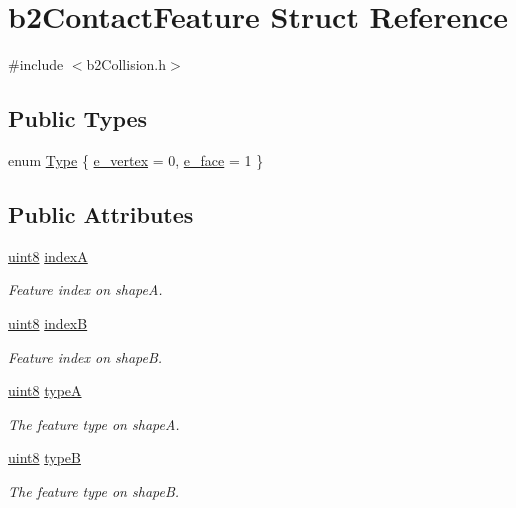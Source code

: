 \hypertarget{structb2_contact_feature}{}\section{b2\+Contact\+Feature Struct Reference}
\label{structb2_contact_feature}


{\ttfamily \#include $<$b2\+Collision.\+h$>$}

\subsection*{Public Types}
\begin{DoxyCompactItemize}
\item 
enum \mbox{\hyperlink{structb2_contact_feature_a29fb037bd886215d2ddd6e68148ac154}{Type}} \{ \mbox{\hyperlink{structb2_contact_feature_a29fb037bd886215d2ddd6e68148ac154aa95b71c62e0571ed761fb1f86e344d87}{e\+\_\+vertex}} = 0, 
\mbox{\hyperlink{structb2_contact_feature_a29fb037bd886215d2ddd6e68148ac154a175f380cac64d8475b95c0d5ad6ef55c}{e\+\_\+face}} = 1
 \}
\end{DoxyCompactItemize}
\subsection*{Public Attributes}
\begin{DoxyCompactItemize}
\item 
\mbox{\hyperlink{b2_settings_8h_adde6aaee8457bee49c2a92621fe22b79}{uint8}} \mbox{\hyperlink{structb2_contact_feature_a833bc746e7cb5e3cd458f1c0809101d0}{indexA}}
\begin{DoxyCompactList}\small\item\em Feature index on shapeA. \end{DoxyCompactList}\item 
\mbox{\hyperlink{b2_settings_8h_adde6aaee8457bee49c2a92621fe22b79}{uint8}} \mbox{\hyperlink{structb2_contact_feature_ad96712b6a0cc1f4b22b85b5948eab81d}{indexB}}
\begin{DoxyCompactList}\small\item\em Feature index on shapeB. \end{DoxyCompactList}\item 
\mbox{\hyperlink{b2_settings_8h_adde6aaee8457bee49c2a92621fe22b79}{uint8}} \mbox{\hyperlink{structb2_contact_feature_a3361b651f0a88fb60ec6aba9f4921cc2}{typeA}}
\begin{DoxyCompactList}\small\item\em The feature type on shapeA. \end{DoxyCompactList}\item 
\mbox{\hyperlink{b2_settings_8h_adde6aaee8457bee49c2a92621fe22b79}{uint8}} \mbox{\hyperlink{structb2_contact_feature_abb74afd6ee5b60834a3f8e2616182bdf}{typeB}}
\begin{DoxyCompactList}\small\item\em The feature type on shapeB. \end{DoxyCompactList}\end{DoxyCompactItemize}


